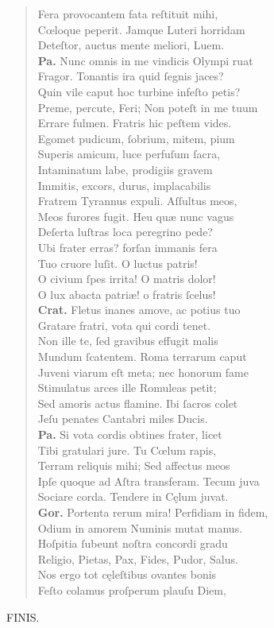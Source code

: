 \documentclass[a4paper,12pt]{article}
\begin{document}
\begin{verse}
Fera provocantem fata reſtituit mihi,\\[0pt]
Cœloque peperit. Jamque Luteri horridam\\[0pt]
Deteſtor, auctus mente meliori, Luem.\\[0pt]
\textbf{Pa.} Nunc omnis in me vindicis Olympi ruat\\[0pt]
Fragor. Tonantis ira quid ſegnis jaces?\\[0pt]
Quin vile caput hoc turbine infeſto petis?\\[0pt]
Preme, percute, Feri; Non poteſt in me tuum\\[0pt]
Errare fulmen. Fratris hic peſtem vides.\\[0pt]
Egomet pudicum, ſobrium, mitem, pium\\[0pt]
Superis amicum, luce perfuſum ſacra,\\[0pt]
Intaminatum labe, prodigiis gravem\\[0pt]
Immitis, excors, durus, implacabilis\\[0pt]
Fratrem Tyrannus expuli. Aſſultus meos,\\[0pt]
Meos furores fugit. Heu quæ nunc vagus\\[0pt]
Deſerta luſtras loca peregrino pede?\\[0pt]
Ubi frater erras? forſan immanis fera\\[0pt]
Tuo cruore luſit. O luctus patris!\\[0pt]
O civium ſpes irrita! O matris dolor!\\[0pt]
O lux abacta patriæ! o fratris ſcelus!\\[0pt]
\textbf{Crat.} Fletus inanes amove, ac potius tuo\\[0pt]
Gratare fratri, vota qui cordi tenet.\\[0pt]
Non ille te, ſed gravibus effugit malis\\[0pt]
Mundum ſcatentem. Roma terrarum caput\\[0pt]
Juveni viarum eſt meta; nec honorum fame\\[0pt]
Stimulatus arces ille Romuleas petit;\\[0pt]
Sed amoris actus flamine. Ibi ſacros colet\\[0pt]
Jeſu penates Cantabri miles Ducis.\\[0pt]
\textbf{Pa.} Si vota cordis obtines frater, licet\\[0pt]
Tibi gratulari jure. Tu Cœlum rapis,\\[0pt]
Terram reliquis mihi; Sed affectus meos\\[0pt]
Ipſe quoque ad Aſtra transferam. Tecum juva\\[0pt]
Sociare corda. Tendere in Cęlum juvat.\\[0pt]
\textbf{Gor.} Portenta rerum mira! Perfidiam in fidem,\\[0pt]
Odium in amorem Numinis mutat manus.\\[0pt]
Hoſpitia ſubeunt noſtra concordi gradu\\[0pt]
Religio, Pietas, Pax, Fides, Pudor, Salus.\\[0pt]
Nos ergo tot cęleſtibus ovantes bonis\\[0pt]
Feſto colamus proſperum plauſu Diem,\\[0pt]
\end{verse}
FINIS.
\end{document}

